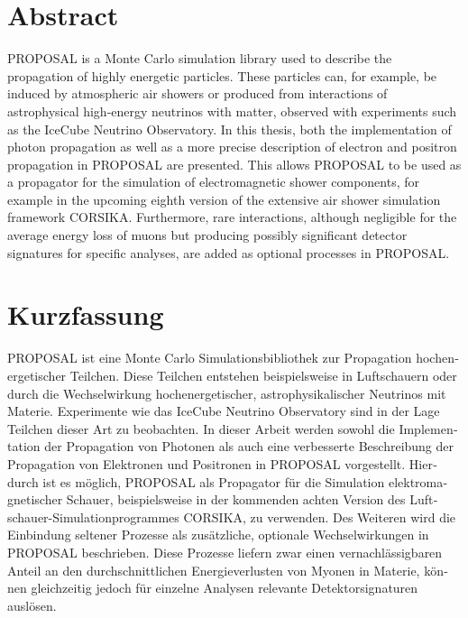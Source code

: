 \thispagestyle{plain}

\section*{Abstract}

PROPOSAL is a \CC Monte Carlo simulation library used to describe the propagation of highly energetic particles. 
These particles can, for example, be induced by atmospheric air showers or produced from interactions of astrophysical high-energy neutrinos with matter, observed with experiments such as the IceCube Neutrino Observatory. 
In this thesis, both the implementation of photon propagation as well as a more precise description of electron and positron propagation in PROPOSAL are presented.
This allows PROPOSAL to be used as a propagator for the simulation of electromagnetic shower components, for example in the upcoming eighth version of the extensive air shower simulation framework CORSIKA. 
Furthermore, rare interactions, although negligible for the average energy loss of muons but producing possibly significant detector signatures for specific analyses, are added as optional processes in PROPOSAL.

\section*{Kurzfassung}
\begin{german}

PROPOSAL ist eine \CC Monte Carlo Simulationsbibliothek zur Propagation hochenergetischer Teilchen.
Diese Teilchen entstehen beispielsweise in Luftschauern oder durch die Wechselwirkung hochenergetischer, astrophysikalischer Neutrinos mit Materie.
Experimente wie das IceCube Neutrino Observatory sind in der Lage Teilchen dieser Art zu beobachten.
In dieser Arbeit werden sowohl die Implementation der Propagation von Photonen als auch eine verbesserte Beschreibung der Propagation von Elektronen und Positronen in PROPOSAL vorgestellt.
Hierdurch ist es möglich, PROPOSAL als Propagator für die Simulation elektromagnetischer Schauer, beispielsweise in der kommenden achten Version des Luftschauer-Simulationprogrammes CORSIKA, zu verwenden.
Des Weiteren wird die Einbindung seltener Prozesse als zusätzliche, optionale Wechselwirkungen in PROPOSAL beschrieben.
Diese Prozesse liefern zwar einen vernachlässigbaren Anteil an den durchschnittlichen Energieverlusten von Myonen in Materie, können gleichzeitig jedoch für einzelne Analysen relevante Detektorsignaturen auslösen. 

\end{german}
